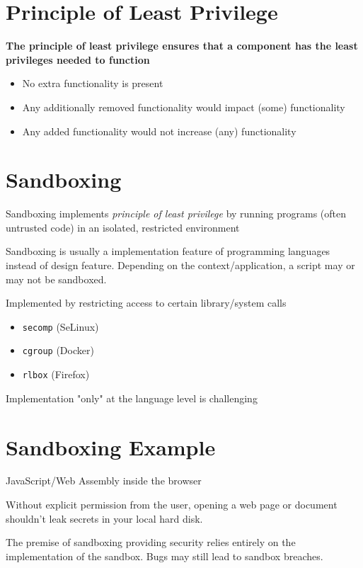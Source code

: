 \documentclass[11pt]{article}
\begin{document}
\vspace{0.5cm}

\section*{Principle of Least Privilege}

\textbf{The principle of least privilege ensures that a component has the least privileges needed to function}

\begin{itemize}
	\item No extra functionality is present
	\item Any additionally removed functionality would impact (some) functionality 
	\item Any added functionality would not increase (any) functionality 
\end{itemize}

\section*{Sandboxing}

Sandboxing implements \textit{principle of least privilege} by running programs (often untrusted code) in an isolated, restricted environment

Sandboxing is usually a implementation feature of programming languages instead of design feature. Depending on the context/application, a script may or may not be sandboxed. 

Implemented by restricting access to certain library/system calls

\begin{itemize}
	\item \verb|secomp| (SeLinux)
	\item \verb|cgroup| (Docker)
	\item \verb|rlbox| (Firefox)
\end{itemize}

Implementation "only" at the language level is challenging
\section*{Sandboxing Example}

JavaScript/Web Assembly inside the browser

Without explicit permission from the user, opening a web page or document shouldn't leak secrets in your local hard disk.

The premise of sandboxing providing security relies entirely on the implementation of the sandbox. Bugs may still lead to sandbox breaches. 
\end{document}
